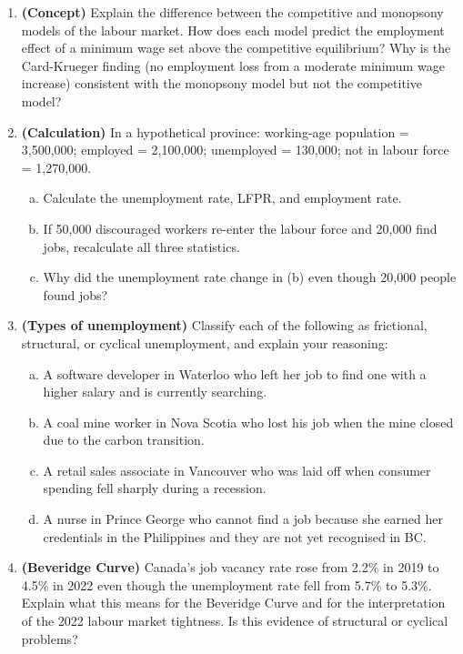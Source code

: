 \begin{enumerate}

\item \textbf{(Concept)} Explain the difference between the competitive
and monopsony models of the labour market. How does each model predict
the employment effect of a minimum wage set above the competitive equilibrium?
Why is the Card-Krueger finding (no employment loss from a moderate minimum
wage increase) consistent with the monopsony model but not the competitive model?

\item \textbf{(Calculation)} In a hypothetical province: working-age
population = 3{,}500{,}000; employed = 2{,}100{,}000; unemployed = 130{,}000;
not in labour force = 1{,}270{,}000.
\begin{enumerate}[(a)]
  \item Calculate the unemployment rate, LFPR, and employment rate.
  \item If 50{,}000 discouraged workers re-enter the labour force and
        20{,}000 find jobs, recalculate all three statistics.
  \item Why did the unemployment rate change in (b) even though 20{,}000
        people found jobs?
\end{enumerate}

\item \textbf{(Types of unemployment)} Classify each of the following
as frictional, structural, or cyclical unemployment, and explain your
reasoning:
\begin{enumerate}[(a)]
  \item A software developer in Waterloo who left her job to find one
        with a higher salary and is currently searching.
  \item A coal mine worker in Nova Scotia who lost his job when the
        mine closed due to the carbon transition.
  \item A retail sales associate in Vancouver who was laid off when
        consumer spending fell sharply during a recession.
  \item A nurse in Prince George who cannot find a job because she
        earned her credentials in the Philippines and they are not
        yet recognised in BC.
\end{enumerate}

\item \textbf{(Beveridge Curve)} Canada's job vacancy rate rose from
2.2\% in 2019 to 4.5\% in 2022 even though the unemployment rate fell
from 5.7\% to 5.3\%. Explain what this means for the Beveridge Curve
and for the interpretation of the 2022 labour market tightness. Is this
evidence of structural or cyclical problems?


\end{enumerate}
